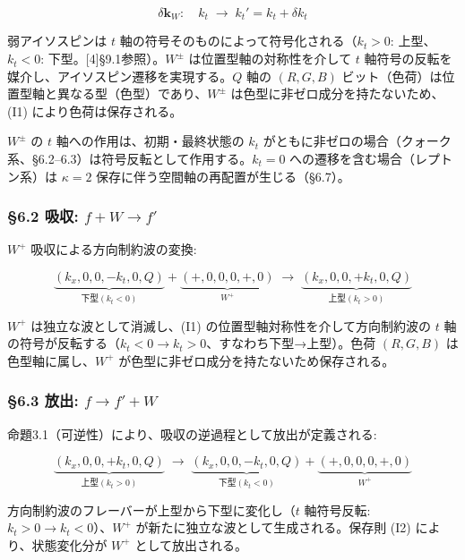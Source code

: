 \documentclass[
  a4paper,11pt]{ltjsarticle}
\theoremstyle{definition}
\theoremstyle{remark}
\begin{document}
\[\delta\mathbf{k}_W: \quad k_t \;\longrightarrow\; k_t' = k_t + \delta k_t\]

弱アイソスピンは \(t\)
軸の符号そのものによって符号化される（\(k_t > 0\): 上型、\(k_t < 0\):
下型。{[}4{]}§9.1参照）。\(W^{\pm}\) は位置型軸の対称性を介して \(t\)
軸符号の反転を媒介し、アイソスピン遷移を実現する。\(Q\) 軸の \((R,G,B)\)
ビット（色荷）は位置型軸と異なる型（色型）であり、\(W^{\pm}\)
は色型に非ゼロ成分を持たないため、(I1) により色荷は保存される。

\(W^{\pm}\) の \(t\) 軸への作用は、初期・最終状態の \(k_t\)
がともに非ゼロの場合（クォーク系、§6.2--6.3）は符号反転として作用する。\(k_t = 0\)
への遷移を含む場合（レプトン系）は \(\kappa = 2\)
保存に伴う空間軸の再配置が生じる（§6.7）。

\subsubsection{\texorpdfstring{§6.2 吸収:
\(f + W \to f'\)}{§6.2 吸収: f + W \textbackslash to f\textquotesingle{}}}\label{ux5438ux53ce-f-w-to-f}

\(W^+\) 吸収による方向制約波の変換:

\[\underbrace{(k_x, 0, 0, -k_t, 0, Q)}_{\text{下型}(k_t < 0)} + \underbrace{(+, 0, 0, 0, +, 0)}_{W^+} \;\longrightarrow\; \underbrace{(k_x, 0, 0, +k_t, 0, Q)}_{\text{上型}(k_t > 0)}\]

\(W^+\) は独立な波として消滅し、(I1)
の位置型軸対称性を介して方向制約波の \(t\)
軸の符号が反転する（\(k_t < 0 \to k_t > 0\)、すなわち下型→上型）。色荷
\((R,G,B)\) は色型軸に属し、\(W^+\)
が色型に非ゼロ成分を持たないため保存される。

\subsubsection{\texorpdfstring{§6.3 放出:
\(f \to f' + W\)}{§6.3 放出: f \textbackslash to f\textquotesingle{} + W}}\label{ux653eux51fa-f-to-f-w}

命題3.1（可逆性）により、吸収の逆過程として放出が定義される:

\[\underbrace{(k_x, 0, 0, +k_t, 0, Q)}_{\text{上型}(k_t > 0)} \;\longrightarrow\; \underbrace{(k_x, 0, 0, -k_t, 0, Q)}_{\text{下型}(k_t < 0)} + \underbrace{(+, 0, 0, 0, +, 0)}_{W^+}\]

方向制約波のフレーバーが上型から下型に変化し（\(t\) 軸符号反転:
\(k_t > 0 \to k_t < 0\)）、\(W^+\)
が新たに独立な波として生成される。保存則 (I2) により、状態変化分が
\(W^+\) として放出される。
\end{document}
